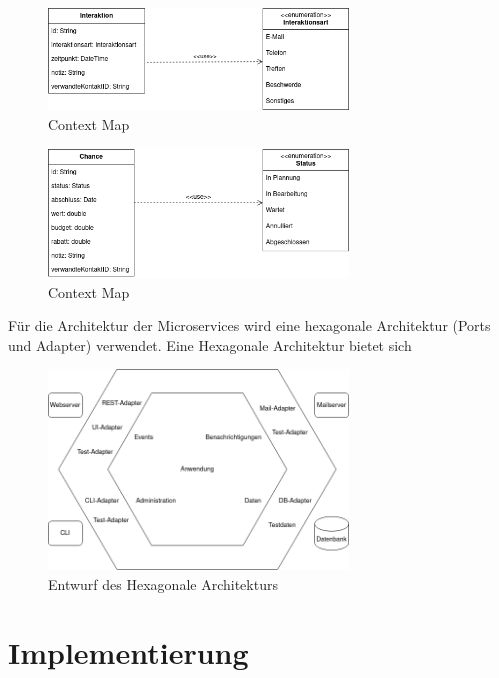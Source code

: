 \begin{figure}[H] 
    \centering
    \includegraphics[width=0.71\textwidth]{figures/InteraktionUMLDiagram.png}
    \caption{Context Map}
    \label{fig:CRMENTWURF}
\end{figure} 

\begin{figure}[H] 
    \centering
    \includegraphics[width=0.71\textwidth]{figures/ChanceUMLDiagram.png}
    \caption{Context Map}
    \label{fig:CRMENTWURF}
\end{figure} 

Für die Architektur der Microservices wird eine hexagonale Architektur (Ports und Adapter) verwendet. Eine Hexagonale Architektur bietet sich 

\begin{figure}[H] 
    \centering
    \includegraphics[width=0.71\textwidth]{figures/HexagonalDesignConcept.png}
    \caption{Entwurf des \acp{Hexagonale Architektur}}
    \label{fig:CRMENTWURF}
\end{figure}

\clearpage
\section{Implementierung}

